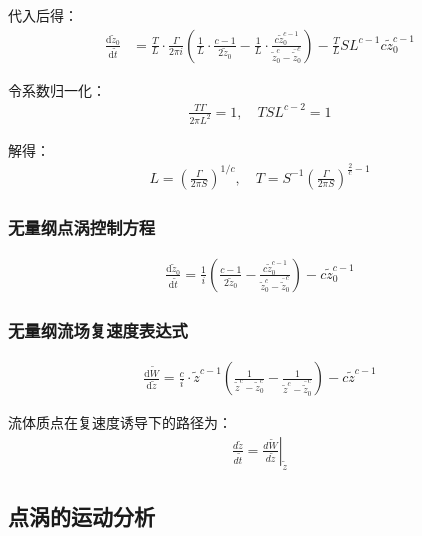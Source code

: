 代入后得：
\begin{align*}
    \frac{\mathrm{d}\tilde{z}_{0}}{\mathrm{d}\tilde{t}} &= \frac{T}{L} \cdot \frac{\Gamma}{2\pi i} \left( \frac{1}{L} \cdot \frac{c-1}{2\tilde{z}_0} - \frac{1}{L} \cdot \frac{c\tilde{z}_0^{c-1}}{\tilde{z}_0^c - \bar{\tilde{z}}_0^c} \right) - \frac{T}{L} SL^{c-1} c\tilde{z}_0^{c-1}
\end{align*}

令系数归一化：
\begin{align*}
    \frac{T\Gamma}{2\pi L^{2}}=1, \quad TSL^{c-2}=1
\end{align*}

解得：
\begin{align*}
    L = \left( \frac{\Gamma}{2\pi S} \right)^{1/c}, \quad
    T = S^{-1} \left( \frac{\Gamma}{2\pi S} \right)^{\frac{2}{c} - 1}
\end{align*}

\subsubsection{无量纲点涡控制方程}

\begin{align}
    \boxed{
    \frac{\mathrm{d}\tilde{z}_{0}}{\mathrm{d}\tilde{t}} = \frac{1}{i} \left( \frac{c-1}{2\tilde{z}_0} - \frac{c\tilde{z}_0^{c-1}}{\tilde{z}_0^c - \bar{\tilde{z}}_0^c} \right) - c \tilde{z}_0^{c-1}
    }
\end{align}

\subsubsection{无量纲流场复速度表达式}

\begin{align}
    \frac{\mathrm{d}\tilde{W}}{\mathrm{d}\tilde{z}} = \frac{c}{i} \cdot \tilde{z}^{c-1} \left( \frac{1}{\tilde{z}^{c} - \tilde{z}_0^{c}} - \frac{1}{\tilde{z}^{c} - \bar{\tilde{z}}_0^{c}} \right) - c \tilde{z}^{c-1}
\end{align}

流体质点在复速度诱导下的路径为：
\begin{align}
    \frac{d\tilde{z}}{d\tilde{t}} = \left. \frac{d\tilde{W}}{d\tilde{z}} \right|_{\tilde{z}}
\end{align}

\subsection{点涡的运动分析}



